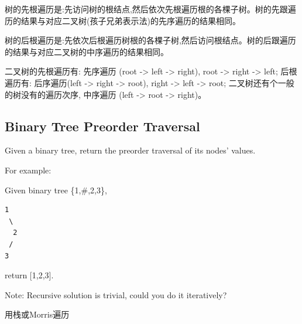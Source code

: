 \documentclass[12pt]{book}
\begin{document}
树的先根遍历是:先访问树的根结点,然后依次先根遍历根的各棵子树。树的先跟遍历的结果与对应二叉树(孩子兄弟表示法)的先序遍历的结果相同。

树的后根遍历是:先依次后根遍历树根的各棵子树,然后访问根结点。树的后跟遍历的结果与对应二叉树的中序遍历的结果相同。

二叉树的先根遍历有: 先序遍历 (root -> left -> right), root -> right -> left; 后根遍历有: 后序遍历(left -> right -> root), right -> left -> root; 二叉树还有个一般的树没有的遍历次序, 中序遍历 (left -> root -> right)。

\subsection{Binary Tree Preorder Traversal}
\label{sec-4-2-1}
Given a binary tree, return the preorder traversal of its nodes' values.

For example:

Given binary tree \{1,\#,2,3\},
\lstset{language=java,label= ,caption= ,numbers=none}
\begin{lstlisting}
1
 \
  2
 /
3
\end{lstlisting}

return [1,2,3].

Note: Recursive solution is trivial, could you do it iteratively?

用栈或Morris遍历
\end{document}
